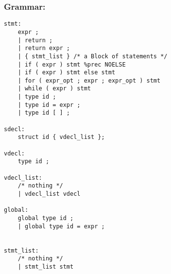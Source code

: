 \documentclass[./LRM_main.tex]{subfiles}
\begin{document}
\subsubsection{Grammar:}
\begin{lstlisting}
stmt:
    expr ;
    | return ;
    | return expr ;
    | { stmt_list } /* a Block of statements */
    | if ( expr ) stmt %prec NOELSE
    | if ( expr ) stmt else stmt
    | for ( expr_opt ; expr ; expr_opt ) stmt
    | while ( expr ) stmt                      
    | type id ;
    | type id = expr ;
    | type id [ ] ;   
 
sdecl:
    struct id { vdecl_list };

vdecl:
    type id ;
    
vdecl_list:
    /* nothing */  
    | vdecl_list vdecl

global:
    global type id ;
    | global type id = expr ;


stmt_list:
    /* nothing */  
    | stmt_list stmt
 

\end{lstlisting}
\end{document}
